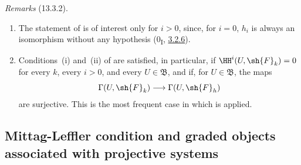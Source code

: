 \begin{env}[13.3.2]
\label{0.13.3.2}
\emph{Remarks} (13.3.2).
\begin{enumerate}
  \item[{\rm(i)}]
  The statement of  is of interest only for $i>0$,
  since, for $i=0$, $h_i$ is always an isomorphism without any
  hypothesis (0\textsubscript{I}, \hyperref[0.3.2.6]{3.2.6}).

  \item[{\rm(ii)}]
  Conditions~{\rm(i)} and~{\rm(ii)} of  are satisfied,
  in particular, if
  $\HH^i(U,\sh{F}_k)=0$ for every $k$, every $i>0$, and every
  $U\in\mathfrak{B}$, and if, for $U\in\mathfrak{B}$, the maps
  \[
    \Gamma(U,\sh{F}_k)\longrightarrow\Gamma(U,\sh{F}_h)
  \]
  are surjective. This is the most frequent case in which
   is applied.
\end{enumerate}
\end{env}

\subsection{Mittag-Leffler condition and graded objects associated with projective systems}
\label{subsection:0.13.4}
\label{0.13.4}

